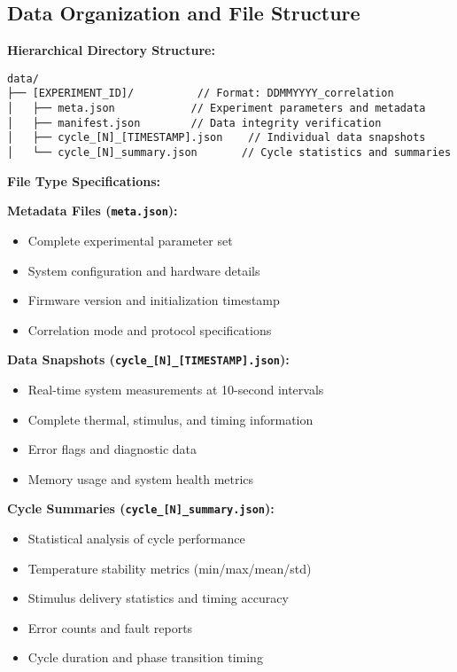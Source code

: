 \documentclass[11pt,a4paper]{article}
\begin{document}
\subsection{Data Organization and File Structure}

\textbf{Hierarchical Directory Structure:}
\begin{verbatim}
data/
├── [EXPERIMENT_ID]/          // Format: DDMMYYYY_correlation
│   ├── meta.json            // Experiment parameters and metadata
│   ├── manifest.json        // Data integrity verification
│   ├── cycle_[N]_[TIMESTAMP].json    // Individual data snapshots
│   └── cycle_[N]_summary.json       // Cycle statistics and summaries
\end{verbatim}

\textbf{File Type Specifications:}

\textbf{Metadata Files (\texttt{meta.json}):}
\begin{itemize}
\item Complete experimental parameter set
\item System configuration and hardware details
\item Firmware version and initialization timestamp
\item Correlation mode and protocol specifications
\end{itemize}

\textbf{Data Snapshots (\texttt{cycle\_[N]\_[TIMESTAMP].json}):}
\begin{itemize}
\item Real-time system measurements at 10-second intervals
\item Complete thermal, stimulus, and timing information
\item Error flags and diagnostic data
\item Memory usage and system health metrics
\end{itemize}

\textbf{Cycle Summaries (\texttt{cycle\_[N]\_summary.json}):}
\begin{itemize}
\item Statistical analysis of cycle performance
\item Temperature stability metrics (min/max/mean/std)
\item Stimulus delivery statistics and timing accuracy
\item Error counts and fault reports
\item Cycle duration and phase transition timing
\end{itemize}
\end{document}
